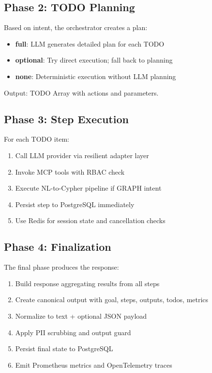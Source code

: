 \documentclass[a4paper,twoside]{sapthesis}
\begin{document}
\subsection{Phase 2: TODO Planning}
\label{subsec:phase2-planning}

Based on intent, the orchestrator creates a plan:

\begin{itemize}
    \item \textbf{full}: LLM generates detailed plan for each TODO
    \item \textbf{optional}: Try direct execution; fall back to planning
    \item \textbf{none}: Deterministic execution without LLM planning
\end{itemize}

Output: TODO Array with actions and parameters.

\subsection{Phase 3: Step Execution}
\label{subsec:phase3-execution}

For each TODO item:

\begin{enumerate}
    \item Call LLM provider via resilient adapter layer
    \item Invoke MCP tools with RBAC check
    \item Execute NL-to-Cypher pipeline if GRAPH intent
    \item Persist step to PostgreSQL immediately
    \item Use Redis for session state and cancellation checks
\end{enumerate}

\subsection{Phase 4: Finalization}
\label{subsec:phase4-finalization}

The final phase produces the response:

\begin{enumerate}
    \item Build response aggregating results from all steps
    \item Create canonical output with goal, steps, outputs, todos, metrics
    \item Normalize to text + optional JSON payload
    \item Apply PII scrubbing and output guard
    \item Persist final state to PostgreSQL
    \item Emit Prometheus metrics and OpenTelemetry traces
\end{enumerate}
\end{document}
